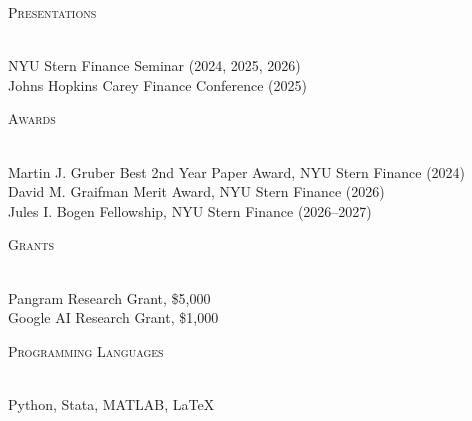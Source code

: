 \documentclass[11pt,a4paper]{article}
\newcommand{\header}[1]{
  {\hspace*{-18pt}\vspace*{6pt}\textsc{#1}}
  \vspace*{-6pt}\lineunder
  \vspace{2mm}
}
\newcommand{\lineunder}{
  \vspace*{-8pt}\\
  \hspace*{-18pt}\hrulefill\\
}
\begin{document}
\header{Presentations}
NYU Stern Finance Seminar (2024, 2025, 2026)\\
Johns Hopkins Carey Finance Conference (2025)
\vspace{2mm}

\header{Awards}
Martin J. Gruber Best 2nd Year Paper Award, NYU Stern Finance (2024)\\
David M. Graifman Merit Award, NYU Stern Finance (2026)\\
Jules I. Bogen Fellowship, NYU Stern Finance (2026--2027)
\vspace{2mm}

\header{Grants}
Pangram Research Grant, \$5,000\\
Google AI Research Grant, \$1,000
\vspace{2mm}

\header{Programming Languages}
Python, Stata, MATLAB, LaTeX
\end{document}
